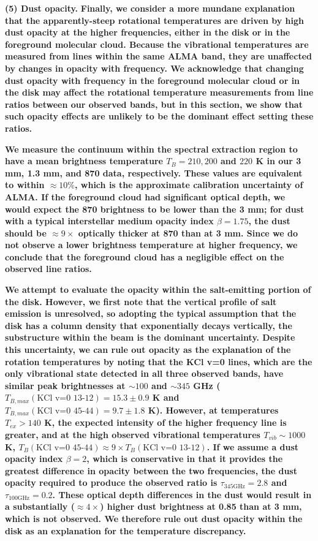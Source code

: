 \documentclass[twocolumn]{aastex62}
\newcommand{\referee}[1]{\textbf{#1}}
\begin{document}
\par{\textbf{(5) Dust opacity.}}
\referee{
Finally, we consider a more mundane explanation that the apparently-steep
rotational temperatures are driven by high dust opacity at the higher
frequencies, either in the disk or in the foreground molecular cloud.
Because the vibrational temperatures are measured from lines within the same
ALMA band, they are unaffected by changes in opacity with frequency.  We
acknowledge that changing dust opacity with frequency in the foreground
molecular cloud or in the disk may affect the rotational temperature
measurements from line ratios between our observed bands, but in this section,
we show that such opacity effects are unlikely to be the dominant effect
setting these ratios.
}

\referee{
We measure the continuum within the spectral extraction region to have
a mean brightness temperature $T_B=210, 200$ and $220$ K in our 3 mm, 1.3 mm, and
870 \um data, respectively.  These values are equivalent to within
$\approx10\%$,
which is the approximate calibration uncertainty of ALMA.  If the foreground
cloud had significant optical depth, we
would expect the 870 \um brightness to be lower than the 3 mm; for dust with a
typical interstellar medium opacity index $\beta=1.75$, the dust should be
$\approx9\times$ optically thicker at
870 \um than at 3 mm.  Since we do not observe a lower
brightness temperature at higher frequency, we conclude that the foreground
cloud has a negligible effect on the observed line ratios.
}

\referee{
We attempt to evaluate the opacity within the salt-emitting portion of the disk.
However, we first note that the vertical profile of salt emission is unresolved,
so adopting the typical assumption that the disk has a column density that
exponentially decays vertically, the substructure within the beam is the
dominant uncertainty.  Despite this uncertainty, we can rule out opacity as the explanation of
the rotation temperatures by noting that
the KCl v=0 lines, which are the only vibrational state detected in all three observed
bands, have similar peak brightnesses at $\sim100$ and $\sim345$ GHz
($T_{B,max}(\textrm{KCl v=0 13-12}) = 15.3\pm0.9$ K and $T_{B,max}(\textrm{KCl
v=0 45-44}) = 9.7\pm1.8$ K).  However, at temperatures $T_{ex} > 140$ K, 
the expected intensity of the higher frequency line is greater, and at
the high observed vibrational temperatures $T_{vib} \sim 1000$ K, $T_{B}(\textrm{KCl
v=0 45-44}) \approx 9 \times T_{B}(\textrm{KCl v=0 13-12})$.
If we assume a dust opacity index $\beta=2$,
which is conservative in that it provides the greatest difference in opacity
between the two frequencies, the dust opacity required to produce the observed ratio
is $\tau_{345 \textrm{GHz}} = 2.8$ and $\tau_{100 \textrm{GHz}} = 0.2$.  These optical
depth differences in the dust would result in a substantially ($\approx4\times$) higher 
dust brightness at 0.85 \um than at 3 mm, which is not observed.  We therefore
rule out dust opacity within the disk as an explanation for the temperature
discrepancy.
}
\end{document}
